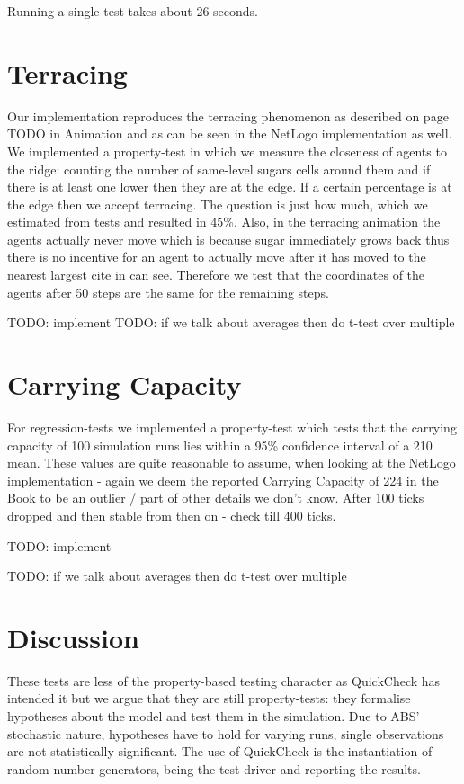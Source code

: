 Running a single test takes about 26 seconds.

\section{Terracing}
Our implementation reproduces the terracing phenomenon as described on page TODO in Animation and as can be seen in the NetLogo implementation as well. We implemented a property-test in which we measure the closeness of agents to the ridge: counting the number of same-level sugars cells around them and if there is at least one lower then they are at the edge. If a certain percentage is at the edge then we accept terracing. The question is just how much, which we estimated from tests and resulted in 45\%. Also, in the terracing animation the agents actually never move which is because sugar immediately grows back thus there is no incentive for an agent to actually move after it has moved to the nearest largest cite in can see. Therefore we test that the coordinates of the agents after 50 steps are the same for the remaining steps.

TODO: implement 
TODO: if we talk about averages then do t-test over multiple

\section{Carrying Capacity}
For regression-tests we implemented a property-test which tests that the carrying capacity of 100 simulation runs lies within a 95\% confidence interval of a 210 mean. These values are quite reasonable to assume, when looking at the NetLogo implementation - again we deem the reported Carrying Capacity of 224 in the Book to be an outlier / part of other details we don't know. After 100 ticks dropped and then stable from then on - check till 400 ticks.

TODO: implement

TODO: if we talk about averages then do t-test over multiple

\section{Discussion}
These tests are less of the property-based testing character as QuickCheck has intended it but we argue that they are still property-tests: they formalise hypotheses about the model and test them in the simulation. Due to ABS' stochastic nature, hypotheses have to hold for varying runs, single observations are not statistically significant. The use of QuickCheck is the instantiation of random-number generators, being the test-driver and reporting the results. 

